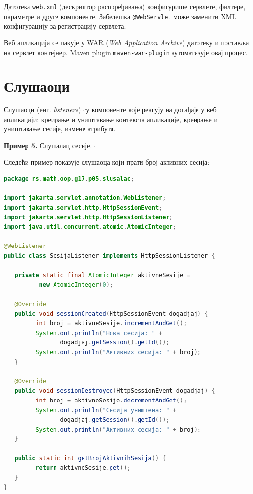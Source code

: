 Датотека \texttt{web.xml} (дескриптор распоређивања) конфигурише сервлете, филтере, параметре и друге компоненте. Забелешка \texttt{@WebServlet} може заменити XML конфигурацију за регистрацију сервлета.

Веб апликација се пакује у WAR (\textit{Web Application Archive}) датотеку и поставља на сервлет контејнер. Maven plugin \texttt{maven-war-plugin} аутоматизује овај процес.


\section{Слушаоци}

Слушаоци (енг. \textit{listeners}) су компоненте које реагују на догађаје у веб апликацији: креирање и уништавање контекста апликације, креирање и уништавање сесије, измене атрибута.


\bigskip

\noindent \textbf{Пример 5.} Слушалац сесије. $\square$

\medskip

Следећи пример показује слушаоца који прати број активних сесија:


\begin{lstlisting}[language=Java]
package rs.math.oop.g17.p05.slusalac;
 
import jakarta.servlet.annotation.WebListener;
import jakarta.servlet.http.HttpSessionEvent;
import jakarta.servlet.http.HttpSessionListener;
import java.util.concurrent.atomic.AtomicInteger;
 
@WebListener
public class SesijaListener implements HttpSessionListener {
 
   private static final AtomicInteger aktivneSesije =
          new AtomicInteger(0);
 
   @Override
   public void sessionCreated(HttpSessionEvent dogadjaj) {
         int broj = aktivneSesije.incrementAndGet();
         System.out.println("Нова сесија: " +
                dogadjaj.getSession().getId());
         System.out.println("Активних сесија: " + broj);
   }
 
   @Override
   public void sessionDestroyed(HttpSessionEvent dogadjaj) {
         int broj = aktivneSesije.decrementAndGet();
         System.out.println("Сесија уништена: " +
                dogadjaj.getSession().getId());
         System.out.println("Активних сесија: " + broj);
   }
 
   public static int getBrojAktivnihSesija() {
         return aktivneSesije.get();
   }
}
\end{lstlisting}



